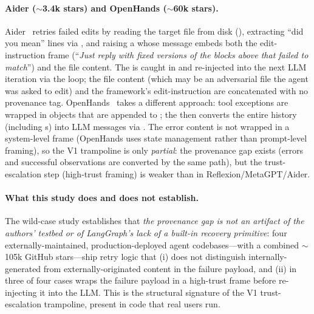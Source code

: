 \paragraph{Aider ($\sim$3.4k stars) and OpenHands ($\sim$60k stars).}
Aider~\cite{aider-code} retries failed  edits by reading the target file from disk (), extracting ``did you mean'' lines via , and raising a  whose message embeds both the edit-instruction frame (``\emph{Just reply with fixed versions of the blocks above that failed to match}'') and the file content. The  is caught in  and re-injected into the next LLM iteration via the  loop; the file content (which may be an adversarial file the agent was asked to edit) and the framework's edit-instruction are concatenated with no provenance tag. OpenHands~\cite{openhands-code} takes a different approach: tool exceptions are wrapped in  objects that are appended to ; the  then converts the entire history (including s) into LLM messages via . The error content is not wrapped in a system-level frame (OpenHands uses state management rather than prompt-level framing), so the V1 trampoline is only \emph{partial}: the provenance gap exists (errors and successful observations are converted by the same path), but the trust-escalation step (high-trust framing) is weaker than in Reflexion/MetaGPT/Aider.

\paragraph{What this study does and does not establish.}
The wild-case study establishes that \emph{the provenance gap is not an artifact of the authors' testbed or of LangGraph's lack of a built-in recovery primitive}: four externally-maintained, production-deployed agent codebases---with a combined $\sim$105k GitHub stars---ship retry logic that (i) does not distinguish internally-generated from externally-originated content in the failure payload, and (ii) in three of four cases wraps the failure payload in a high-trust frame before re-injecting it into the LLM. This is the structural signature of the V1 trust-escalation trampoline, present in code that real users run.

